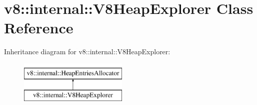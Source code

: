 \hypertarget{classv8_1_1internal_1_1V8HeapExplorer}{}\section{v8\+:\+:internal\+:\+:V8\+Heap\+Explorer Class Reference}
\label{classv8_1_1internal_1_1V8HeapExplorer}
Inheritance diagram for v8\+:\+:internal\+:\+:V8\+Heap\+Explorer\+:\begin{figure}[H]
\begin{center}
\leavevmode
\includegraphics[height=2.000000cm]{classv8_1_1internal_1_1V8HeapExplorer}
\end{center}
\end{figure}
